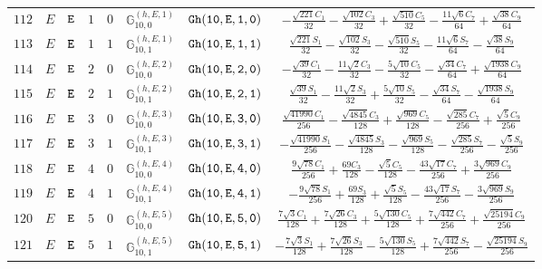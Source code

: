 \documentclass[fleqn,8pt]{jsarticle}
\begin{document}
\begin{table}[ht!]
\begin{center}
\begin{tabular}{cccccccc}
$ 112 $ & $ E $ & $ {\tt E} $ & $ 1 $ & $ 0 $ & $ \mathbb{G}_{10,0}^{(h,E,1)} $ & $ {\tt Gh(10,E,1,0)} $ & $ - \frac{\sqrt{221} C_{1}}{32} - \frac{\sqrt{102} C_{3}}{32} + \frac{\sqrt{510} C_{5}}{32} - \frac{11 \sqrt{6} C_{7}}{64} + \frac{\sqrt{38} C_{9}}{64} $ \\
$ 113 $ & $ E $ & $ {\tt E} $ & $ 1 $ & $ 1 $ & $ \mathbb{G}_{10,1}^{(h,E,1)} $ & $ {\tt Gh(10,E,1,1)} $ & $ \frac{\sqrt{221} S_{1}}{32} - \frac{\sqrt{102} S_{3}}{32} - \frac{\sqrt{510} S_{5}}{32} - \frac{11 \sqrt{6} S_{7}}{64} - \frac{\sqrt{38} S_{9}}{64} $ \\
$ 114 $ & $ E $ & $ {\tt E} $ & $ 2 $ & $ 0 $ & $ \mathbb{G}_{10,0}^{(h,E,2)} $ & $ {\tt Gh(10,E,2,0)} $ & $ - \frac{\sqrt{39} C_{1}}{32} - \frac{11 \sqrt{2} C_{3}}{32} - \frac{5 \sqrt{10} C_{5}}{32} - \frac{\sqrt{34} C_{7}}{64} + \frac{\sqrt{1938} C_{9}}{64} $ \\
$ 115 $ & $ E $ & $ {\tt E} $ & $ 2 $ & $ 1 $ & $ \mathbb{G}_{10,1}^{(h,E,2)} $ & $ {\tt Gh(10,E,2,1)} $ & $ \frac{\sqrt{39} S_{1}}{32} - \frac{11 \sqrt{2} S_{3}}{32} + \frac{5 \sqrt{10} S_{5}}{32} - \frac{\sqrt{34} S_{7}}{64} - \frac{\sqrt{1938} S_{9}}{64} $ \\
$ 116 $ & $ E $ & $ {\tt E} $ & $ 3 $ & $ 0 $ & $ \mathbb{G}_{10,0}^{(h,E,3)} $ & $ {\tt Gh(10,E,3,0)} $ & $ \frac{\sqrt{41990} C_{1}}{256} - \frac{\sqrt{4845} C_{3}}{128} + \frac{\sqrt{969} C_{5}}{128} - \frac{\sqrt{285} C_{7}}{256} + \frac{\sqrt{5} C_{9}}{256} $ \\
$ 117 $ & $ E $ & $ {\tt E} $ & $ 3 $ & $ 1 $ & $ \mathbb{G}_{10,1}^{(h,E,3)} $ & $ {\tt Gh(10,E,3,1)} $ & $ - \frac{\sqrt{41990} S_{1}}{256} - \frac{\sqrt{4845} S_{3}}{128} - \frac{\sqrt{969} S_{5}}{128} - \frac{\sqrt{285} S_{7}}{256} - \frac{\sqrt{5} S_{9}}{256} $ \\
$ 118 $ & $ E $ & $ {\tt E} $ & $ 4 $ & $ 0 $ & $ \mathbb{G}_{10,0}^{(h,E,4)} $ & $ {\tt Gh(10,E,4,0)} $ & $ \frac{9 \sqrt{78} C_{1}}{256} + \frac{69 C_{3}}{128} - \frac{\sqrt{5} C_{5}}{128} - \frac{43 \sqrt{17} C_{7}}{256} + \frac{3 \sqrt{969} C_{9}}{256} $ \\
$ 119 $ & $ E $ & $ {\tt E} $ & $ 4 $ & $ 1 $ & $ \mathbb{G}_{10,1}^{(h,E,4)} $ & $ {\tt Gh(10,E,4,1)} $ & $ - \frac{9 \sqrt{78} S_{1}}{256} + \frac{69 S_{3}}{128} + \frac{\sqrt{5} S_{5}}{128} - \frac{43 \sqrt{17} S_{7}}{256} - \frac{3 \sqrt{969} S_{9}}{256} $ \\
$ 120 $ & $ E $ & $ {\tt E} $ & $ 5 $ & $ 0 $ & $ \mathbb{G}_{10,0}^{(h,E,5)} $ & $ {\tt Gh(10,E,5,0)} $ & $ \frac{7 \sqrt{3} C_{1}}{128} + \frac{7 \sqrt{26} C_{3}}{128} + \frac{5 \sqrt{130} C_{5}}{128} + \frac{7 \sqrt{442} C_{7}}{256} + \frac{\sqrt{25194} C_{9}}{256} $ \\
$ 121 $ & $ E $ & $ {\tt E} $ & $ 5 $ & $ 1 $ & $ \mathbb{G}_{10,1}^{(h,E,5)} $ & $ {\tt Gh(10,E,5,1)} $ & $ - \frac{7 \sqrt{3} S_{1}}{128} + \frac{7 \sqrt{26} S_{3}}{128} - \frac{5 \sqrt{130} S_{5}}{128} + \frac{7 \sqrt{442} S_{7}}{256} - \frac{\sqrt{25194} S_{9}}{256} $ \\
 \hline \hline
\end{tabular}
\end{center}
\end{table}
\end{document}
